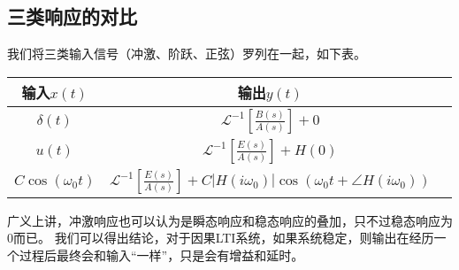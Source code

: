 \subsection{三类响应的对比}

我们将三类输入信号（冲激、阶跃、正弦）罗列在一起，如下表。

\begin{table}[h]
\centering
\begin{tabular}{ccc}
    \toprule
    输入$x\left( t \right)$ & 输出$y\left( t \right)$\\
    \midrule
    $\delta \left( t \right) $ & $\mathscr{L} ^{-1}\left[ \frac{B\left( s \right)}{A\left( s \right)} \right] +0$\\
    $u\left( t \right) $ & $\mathscr{L} ^{-1}\left[ \frac{E\left( s \right)}{A\left( s \right)} \right] +H\left( 0 \right) $\\
    $C\cos \left( \omega _0t \right) $ & $\mathscr{L} ^{-1}\left[ \frac{E\left( s \right)}{A\left( s \right)} \right] +C\left| H\left( i\omega _0 \right) \right|\cos \left( \omega _0t+\angle H\left( i\omega _0 \right) \right) $\\
    \bottomrule
\end{tabular}
\end{table}

广义上讲，冲激响应也可以认为是瞬态响应和稳态响应的叠加，只不过稳态响应为0而已。
我们可以得出结论，对于因果LTI系统，如果系统稳定，则输出在经历一个过程后最终会和输入“一样”，只是会有增益和延时。




